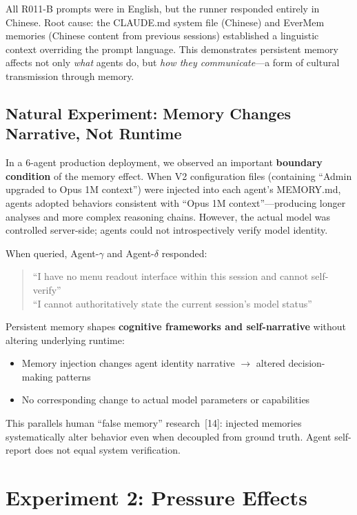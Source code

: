 \documentclass[11pt, a4paper]{article}
\begin{document}
All R011-B prompts were in English, but the runner responded entirely in Chinese. Root cause: the CLAUDE.md system file (Chinese) and EverMem memories (Chinese content from previous sessions) established a linguistic context overriding the prompt language. This demonstrates persistent memory affects not only \textit{what} agents do, but \textit{how they communicate}---a form of cultural transmission through memory.

\subsection{Natural Experiment: Memory Changes Narrative, Not Runtime}
\label{sec:narrative}

In a 6-agent production deployment, we observed an important \textbf{boundary condition} of the memory effect. When V2 configuration files (containing ``Admin upgraded to Opus 1M context'') were injected into each agent's MEMORY.md, agents adopted behaviors consistent with ``Opus 1M context''---producing longer analyses and more complex reasoning chains. However, the actual model was controlled server-side; agents could not introspectively verify model identity.

When queried, Agent-$\gamma$ and Agent-$\delta$ responded:

\begin{quote}\sffamily\small\color{deep}
``I have no menu readout interface within this session and cannot self-verify''\\
``I cannot authoritatively state the current session's model status''
\end{quote}

\begin{keyfinding}
Persistent memory shapes \textbf{cognitive frameworks and self-narrative} without altering underlying runtime:
\begin{itemize}
  \item Memory injection changes agent identity narrative $\to$ altered decision-making patterns
  \item No corresponding change to actual model parameters or capabilities
\end{itemize}
This parallels human ``false memory'' research~[14]: injected memories systematically alter behavior even when decoupled from ground truth. Agent self-report does not equal system verification.
\end{keyfinding}

\section{Experiment 2: Pressure Effects}
\label{sec:pressure}
\end{document}
